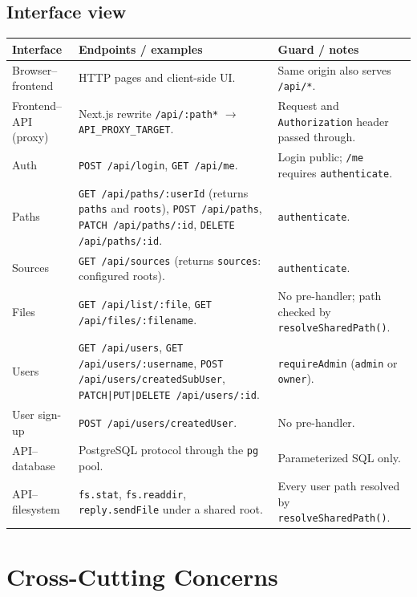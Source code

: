 \documentclass[10pt]{article}
\begin{document}
\subsection{Interface view}
\small
\begin{tabularx}{\linewidth}{>{\raggedright\arraybackslash}p{3.6cm}
                              >{\raggedright\arraybackslash}X
                              >{\raggedright\arraybackslash}p{6.2cm}}
\textbf{Interface} & \textbf{Endpoints / examples} & \textbf{Guard / notes} \\
\hline
Browser--frontend & HTTP pages and client-side UI. & Same origin also serves \texttt{/api/*}. \\
Frontend--API (proxy) & Next.js rewrite \texttt{/api/:path*} $\rightarrow$ \texttt{API\_PROXY\_TARGET}. & Request and \texttt{Authorization} header passed through. \\
Auth & \texttt{POST /api/login}, \texttt{GET /api/me}. & Login public; \texttt{/me} requires \texttt{authenticate}. \\
Paths & \texttt{GET /api/paths/:userId} (returns \texttt{paths} and \texttt{roots}), \texttt{POST /api/paths}, \texttt{PATCH /api/paths/:id}, \texttt{DELETE /api/paths/:id}. & \texttt{authenticate}. \\
Sources & \texttt{GET /api/sources} (returns \texttt{sources}: configured roots). & \texttt{authenticate}. \\
Files & \texttt{GET /api/list/:file}, \texttt{GET /api/files/:filename}. & No pre-handler; path checked by \texttt{resolveSharedPath()}. \\
Users & \texttt{GET /api/users}, \texttt{GET /api/users/:username}, \texttt{POST /api/users/createdSubUser}, \texttt{PATCH|PUT|DELETE /api/users/:id}. & \texttt{requireAdmin} (\texttt{admin} or \texttt{owner}). \\
User sign-up & \texttt{POST /api/users/createdUser}. & No pre-handler. \\
API--database & PostgreSQL protocol through the \texttt{pg} pool. & Parameterized SQL only. \\
API--filesystem & \texttt{fs.stat}, \texttt{fs.readdir}, \texttt{reply.sendFile} under a shared root. & Every user path resolved by \texttt{resolveSharedPath()}. \\
\end{tabularx}
\normalsize

\section{Cross-Cutting Concerns}
\end{document}
